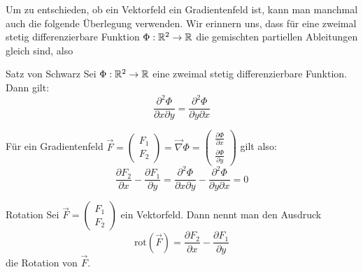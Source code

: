 Um zu entschieden, ob ein Vektorfeld ein Gradientenfeld ist, kann man manchmal auch die folgende Überlegung verwenden. Wir erinnern uns, dass für eine zweimal stetig differenzierbare Funktion \(\Phi: \mathbb{R}^2 \to \mathbb{R}\) die gemischten partiellen Ableitungen gleich sind, also
\begin{satz}
    {Satz von Schwarz}{
    }
    Sei \(\Phi: \mathbb{R}^2 \to \mathbb{R}\) eine zweimal stetig differenzierbare Funktion. Dann gilt:
    \[\frac{\partial^2 \Phi}{\partial x \partial y} = \frac{\partial^2 \Phi}{\partial y \partial x}\]
\end{satz}

Für ein Gradientenfeld \(\vec{F} = \begin{pmatrix}
    F_1 \\ F_2
\end{pmatrix} = \vec{\nabla} \Phi = \begin{pmatrix}
    \frac{\partial \Phi}{\partial x} \\ \frac{\partial \Phi}{\partial y}
\end{pmatrix}\) gilt also:
\[  \frac{\partial F_2}{\partial x}-\frac{\partial F_1}{\partial y} =  \frac{\partial^2 \Phi}{\partial x \partial y}-\frac{\partial^2 \Phi}{\partial y \partial x}  = 0\]

\begin{definition}
    {Rotation}{}
    Sei \(\vec{F} = \begin{pmatrix}
        F_1 \\ F_2
    \end{pmatrix}\) ein Vektorfeld. Dann nennt man den Ausdruck
    \[\text{rot}(\vec{F}) = \frac{\partial F_2}{\partial x} - \frac{\partial F_1}{\partial y}\]
    die Rotation von \(\vec{F}\).
\end{definition}

